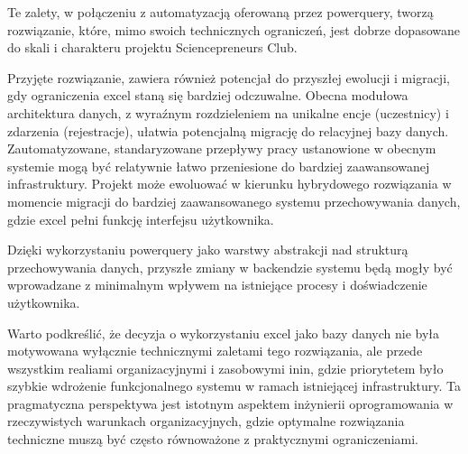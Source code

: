 Te zalety, w połączeniu z automatyzacją oferowaną przez \gls{powerquery}, tworzą rozwiązanie, które, mimo swoich technicznych ograniczeń, jest dobrze dopasowane do skali i charakteru projektu Sciencepreneurs Club.

Przyjęte rozwiązanie, zawiera również potencjał do przyszłej ewolucji i migracji, gdy ograniczenia \gls{excel} staną się bardziej odczuwalne. Obecna modułowa architektura danych, z wyraźnym rozdzieleniem na unikalne encje (uczestnicy) i zdarzenia (rejestracje), ułatwia potencjalną migrację do relacyjnej bazy danych. Zautomatyzowane, standaryzowane przepływy pracy ustanowione w obecnym systemie mogą być relatywnie łatwo przeniesione do bardziej zaawansowanej infrastruktury. Projekt może ewoluować w kierunku hybrydowego rozwiązania w momencie migracji do bardziej zaawansowanego systemu przechowywania danych, gdzie \gls{excel} pełni funkcję interfejsu użytkownika.

Dzięki wykorzystaniu \gls{powerquery} jako warstwy abstrakcji nad strukturą przechowywania danych, przyszłe zmiany w backendzie systemu będą mogły być wprowadzane z minimalnym wpływem na istniejące procesy i doświadczenie użytkownika.

Warto podkreślić, że decyzja o wykorzystaniu \gls{excel} jako bazy danych nie była motywowana wyłącznie technicznymi zaletami tego rozwiązania, ale przede wszystkim realiami organizacyjnymi i zasobowymi \gls{inin}, gdzie priorytetem było szybkie wdrożenie funkcjonalnego systemu w ramach istniejącej infrastruktury. Ta pragmatyczna perspektywa jest istotnym aspektem inżynierii oprogramowania w rzeczywistych warunkach organizacyjnych, gdzie optymalne rozwiązania techniczne muszą być często równoważone z praktycznymi ograniczeniami.